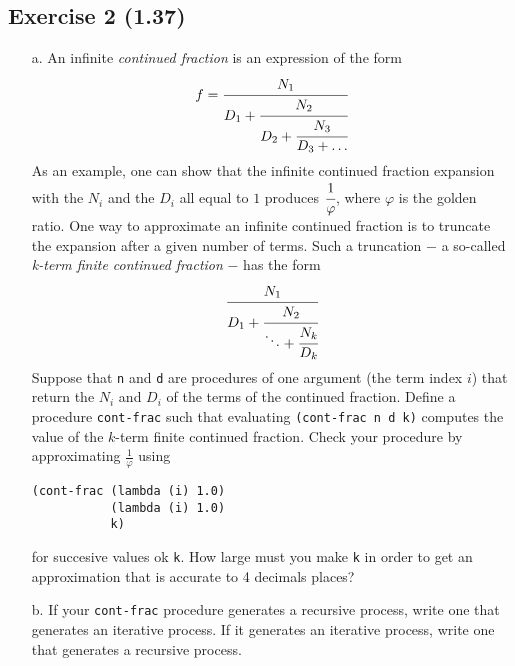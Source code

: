 \subsection*{Exercise 2 (1.37)}
\begin{itemize}
    \item[a.] An infinite \textit{continued fraction} is an expression of the form 
        \[ f = \cfrac{N_{1}}{D_{1} + \cfrac{N_{2}}{D_{2} + \cfrac{N_{3}}{D_{3} + \dots}}} \] 
        As an example, one can show that the infinite continued fraction expansion with the $ N_{i} $ and the $ D_{i} $
        all equal to $ 1 $ produces $ \cfrac{1}{\varphi} $, where $ \varphi $ is the golden ratio.
        One way to approximate an infinite continued fraction is to truncate the expansion after a given number of terms.
        Such a truncation $ - $ a so-called \textit{k-term finite continued fraction} $ - $ has the form
        \[ \cfrac{N_{1}}{D_{1} + \cfrac{N_{2}}{\ddots + \cfrac{N_{k}}{D_{k}}}} \]
        Suppose that \texttt{n} and \texttt{d} are procedures of one argument (the term index $ i $) that return the $ N_{i} $
        and $ D_{i} $ of the terms of the continued fraction.
        Define a procedure \texttt{cont-frac} such that evaluating \texttt{(cont-frac n d k)} computes the value of the $k$-term
        finite continued fraction. Check your procedure by approximating $ \frac{1}{\varphi} $ using
        \begin{lstlisting}
(cont-frac (lambda (i) 1.0)
           (lambda (i) 1.0)
           k)
        \end{lstlisting} 
        for succesive values ok \texttt{k}. How large must you make \texttt{k} in order to get an approximation that is accurate
        to 4 decimals places?
    
    \item[b.] If your \texttt{cont-frac} procedure generates a recursive process, write one that generates an iterative process. If
        it generates an iterative process, write one that generates a recursive process.    
\end{itemize}

